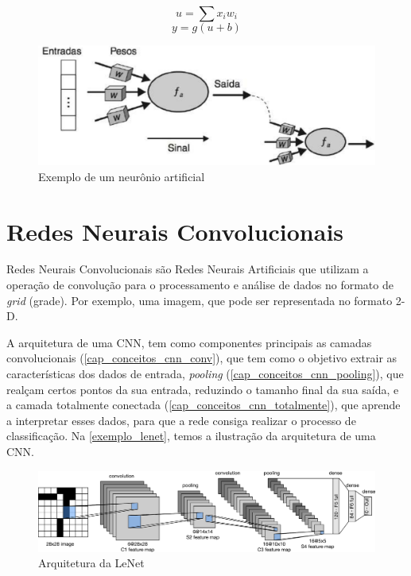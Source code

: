 \begin{equation}\label{eq_neuronio}
u = \sum x_i w_i
\end{equation}
\begin{equation}\label{eq_ativacao}
y = g(u + b)
\end{equation}

\begin{figure}[htb]
	\caption {\label{cap_conceitos_ex_neuronio} Exemplo de um neurônio artificial}
	\begin{center}
		\includegraphics[scale=0.3]{Imagens/exemplo_neuronio_artificial}
	\end{center}
\end{figure}

\section{Redes Neurais Convolucionais}\label{cap_conceitos_cnn}
Redes Neurais Convolucionais são Redes Neurais Artificiais que utilizam a operação de convolução para o processamento e
análise de dados no formato de \textit{grid} (grade).
Por exemplo, uma imagem, que pode ser representada no formato 2-D. \cite{Goodfellow-et-al-2016}

A arquitetura de uma CNN, tem como componentes principais as camadas convolucionais (\ref{cap_conceitos_cnn_conv}),
que tem como o objetivo extrair as características dos dados de entrada, \textit{pooling}
(\ref{cap_conceitos_cnn_pooling}), que realçam certos pontos da sua entrada, reduzindo o tamanho final da sua
saída, e a camada totalmente conectada (\ref{cap_conceitos_cnn_totalmente}), que aprende a interpretar esses dados,
para que a rede consiga realizar o processo de classificação.
Na \autoref{exemplo_lenet}, temos a ilustração da arquitetura de uma CNN.

\begin{figure}[htb]
	\caption {\label{exemplo_lenet} Arquitetura da LeNet}
	\begin{center}
		\includegraphics[scale=0.5]{Imagens/lenet}
	\end{center}
\end{figure}

